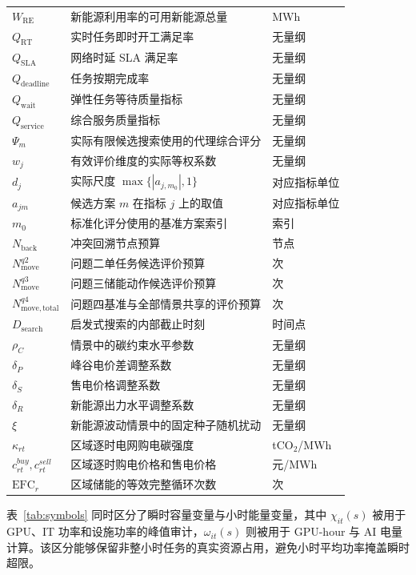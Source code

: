\documentclass[withoutpreface,bwprint]{cumcmthesis}
\begin{document}
\begin{longtable}{lll}
$W_{\mathrm{RE}}$ & 新能源利用率的可用新能源总量 & MWh \\
$Q_{\mathrm{RT}}$ & 实时任务即时开工满足率 & 无量纲 \\
$Q_{\mathrm{SLA}}$ & 网络时延 SLA 满足率 & 无量纲 \\
$Q_{\mathrm{deadline}}$ & 任务按期完成率 & 无量纲 \\
$Q_{\mathrm{wait}}$ & 弹性任务等待质量指标 & 无量纲 \\
$Q_{\mathrm{service}}$ & 综合服务质量指标 & 无量纲 \\
$\Psi_m$ & 实际有限候选搜索使用的代理综合评分 & 无量纲 \\
$w_j$ & 有效评价维度的实际等权系数 & 无量纲 \\
$d_j$ & 实际尺度 $\max\{|a_{j,m_0}|,1\}$ & 对应指标单位 \\
$a_{jm}$ & 候选方案 $m$ 在指标 $j$ 上的取值 & 对应指标单位 \\
$m_0$ & 标准化评分使用的基准方案索引 & 索引 \\
$N_{\mathrm{back}}$ & 冲突回溯节点预算 & 节点 \\
$N_{\mathrm{move}}^{q2}$ & 问题二单任务候选评价预算 & 次 \\
$N_{\mathrm{move}}^{q3}$ & 问题三储能动作候选评价预算 & 次 \\
$N_{\mathrm{move,total}}^{q4}$ & 问题四基准与全部情景共享的评价预算 & 次 \\
$D_{\mathrm{search}}$ & 启发式搜索的内部截止时刻 & 时间点 \\
$\rho_C$ & 情景中的碳约束水平参数 & 无量纲 \\
$\delta_P$ & 峰谷电价差调整系数 & 无量纲 \\
$\delta_S$ & 售电价格调整系数 & 无量纲 \\
$\delta_R$ & 新能源出力水平调整系数 & 无量纲 \\
$\xi$ & 新能源波动情景中的固定种子随机扰动 & 无量纲 \\
$\kappa_{rt}$ & 区域逐时电网购电碳强度 & tCO$_2$/MWh \\
$c_{rt}^{buy},c_{rt}^{sell}$ & 区域逐时购电价格和售电价格 & 元/MWh \\
$\mathrm{EFC}_r$ & 区域储能的等效完整循环次数 & 次 \\
\end{longtable}
\normalsize

表~\ref{tab:symbols} 同时区分了瞬时容量变量与小时能量变量，其中 $\chi_{it}(s)$ 被用于 GPU、IT 功率和设施功率的峰值审计，$\omega_{it}(s)$ 则被用于 GPU-hour 与 AI 电量计算。该区分能够保留非整小时任务的真实资源占用，避免小时平均功率掩盖瞬时超限。
\end{document}
